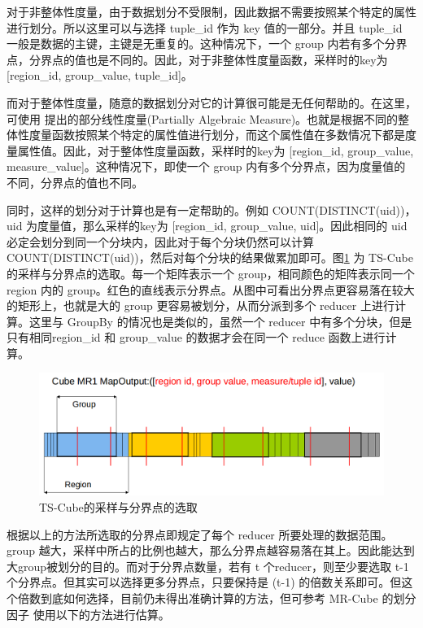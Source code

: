 对于非整体性度量，由于数据划分不受限制，因此数据不需要按照某个特定的属性进行划分。所以这里可以与选择 tuple\_id 作为 key 值的一部分。并且 tuple\_id 一般是数据的主键，主键是无重复的。这种情况下，一个 group 内若有多个分界点，分界点的值也是不同的。因此，对于非整体性度量函数，采样时的key为 [region\_id, group\_value, tuple\_id]。

而对于整体性度量，随意的数据划分对它的计算很可能是无任何帮助的。在这里，可使用 \cite{nandi2011distributed} 提出的部分线性度量(Partially Algebraic Measure)。也就是根据不同的整体性度量函数按照某个特定的属性值进行划分，而这个属性值在多数情况下都是度量属性值。因此，对于整体性度量函数，采样时的key为 [region\_id, group\_value, measure\_value]。这种情况下，即使一个 group 内有多个分界点，因为度量值的不同，分界点的值也不同。

同时，这样的划分对于计算也是有一定帮助的。例如 COUNT(DISTINCT(uid))，uid 为度量值，那么采样的key为 [region\_id, group\_value, uid]。因此相同的 uid 必定会划分到同一个分块内，因此对于每个分块仍然可以计算 COUNT(DISTINCT(uid))，然后对每个分块的结果做累加即可。图\ref{tscube_picture} 为 TS-Cube 的采样与分界点的选取。每一个矩阵表示一个 group，相同颜色的矩阵表示同一个 region 内的 group。红色的直线表示分界点。从图中可看出分界点更容易落在较大的矩形上，也就是大的 group 更容易被划分，从而分派到多个 reducer 上进行计算。这里与 GroupBy 的情况也是类似的，虽然一个 reducer 中有多个分块，但是只有相同region\_id 和 group\_value 的数据才会在同一个 reduce 函数上进行计算。

\begin{figure}[!htb] 
\centering\includegraphics[width=6in]{picture/ch_terasort_mr/tscube_picture} 
\caption{TS-Cube的采样与分界点的选取}\label{tscube_picture} 
\end{figure}

根据以上的方法所选取的分界点即规定了每个 reducer 所要处理的数据范围。group 越大，采样中所占的比例也越大，那么分界点越容易落在其上。因此能达到大group被划分的目的。而对于分界点数量，若有 t 个reducer，则至少要选取 t-1 个分界点。但其实可以选择更多分界点，只要保持是 (t-1) 的倍数关系即可。但这个倍数到底如何选择，目前仍未得出准确计算的方法，但可参考 MR-Cube 的划分因子 \cite{nandi2011distributed} 使用以下的方法进行估算。

